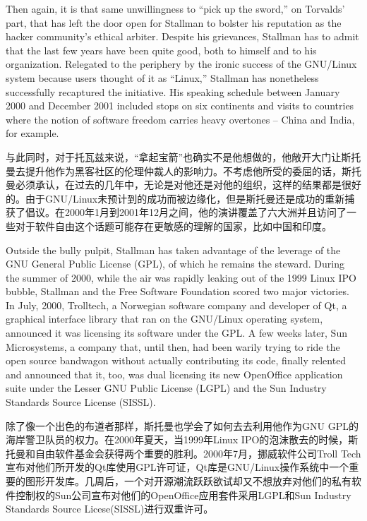 \ifdefined\eng
Then again, it is that same unwillingness to ``pick up the sword,'' on Torvalds' part, that has left the door open for Stallman to bolster his reputation as the hacker community's ethical arbiter. Despite his grievances, Stallman has to admit that the last few years have been quite good, both to himself and to his organization. Relegated to the periphery by the ironic success of the GNU/Linux system because users thought of it as ``Linux,'' Stallman has nonetheless successfully recaptured the initiative. His speaking schedule between January 2000 and December 2001 included stops on six continents and visits to countries where the notion of software freedom carries heavy overtones -- China and India, for example.
\fi

\ifdefined\chs
与此同时，对于托瓦兹来说，“拿起宝箭”也确实不是他想做的，他敞开大门让斯托曼去提升他作为黑客社区的伦理仲裁人的影响力。不考虑他所受的委屈的话，斯托曼必须承认，在过去的几年中，无论是对他还是对他的组织，这样的结果都是很好的。由于GNU/Linux未预计到的成功而被边缘化，但是斯托曼还是成功的重新捕获了倡议。在2000年1月到2001年12月之间，他的演讲覆盖了六大洲并且访问了一些对于软件自由这个话题可能存在更敏感的理解的国家，比如中国和印度。
\fi

\ifdefined\eng
Outside the bully pulpit, Stallman has taken advantage of the leverage of the GNU General Public License (GPL), of which he remains the steward. During the summer of 2000, while the air was rapidly leaking out of the 1999 Linux IPO bubble, Stallman and the Free Software Foundation scored two major victories. In July, 2000, Trolltech, a Norwegian software company and developer of Qt, a graphical interface library that ran on the GNU/Linux operating system, announced it was licensing its software under the GPL. A few weeks later, Sun Microsystems, a company that, until then, had been warily trying to ride the open source bandwagon without actually contributing its code, finally relented and announced that it, too, was dual licensing its new OpenOffice application suite under the Lesser GNU Public License (LGPL) and the Sun Industry Standards Source License (SISSL).
\fi

\ifdefined\chs
除了像一个出色的布道者那样，斯托曼也学会了如何去去利用他作为GNU GPL的海岸警卫队员的权力。在2000年夏天，当1999年Linux IPO的泡沫散去的时候，斯托曼和自由软件基金会获得两个重要的胜利。2000年7月，挪威软件公司Troll Tech宣布对他们所开发的Qt库使用GPL许可证，Qt库是GNU/Linux操作系统中一个重要的图形开发库。几周后，一个对开源潮流跃跃欲试却又不想放弃对他们的私有软件控制权的Sun公司宣布对他们的OpenOffice应用套件采用LGPL和Sun Industry Standards Source Licese(SISSL)进行双重许可。
\fi

